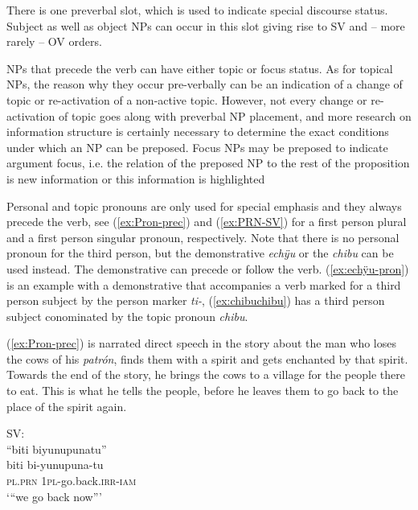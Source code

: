 There is one preverbal slot, which is used to indicate special discourse status. Subject as well as object NPs can occur in this slot giving rise to SV and – more rarely – OV orders. 

NPs that precede the verb can have either topic or focus status.  As for topical NPs, the reason why they occur pre-verbally can be an indication of a change of topic or re-activation of a non-active topic. However, not every change or re-activation of topic goes along with preverbal NP placement, and more research on information structure is certainly necessary to determine the exact conditions under which an NP can be preposed. Focus NPs may be preposed to indicate argument focus, i.e. the relation of the preposed NP to the rest of the proposition is new information or this information is highlighted \citep[cf.][228]{Lambrecht1994}

Personal and topic pronouns are only used for special emphasis and they always precede the verb, see (\ref{ex:Pron-prec}) and (\ref{ex:PRN-SV}) for a first person plural and a first person singular pronoun, respectively. Note that there is no personal pronoun for the third person, but the demonstrative \textit{echÿu} or the  \textit{chibu} can be used instead. The demonstrative can precede or follow the verb. (\ref{ex:echÿu-pron}) is an example with a demonstrative that accompanies a verb marked for a third person subject by the person marker \textit{ti-}, (\ref{ex:chibuchibu}) has a third person subject conominated by the topic pronoun \textit{chibu}.  %

(\ref{ex:Pron-prec}) is narrated direct speech in the story about the man who loses the cows of his \textit{patrón}, finds them with a spirit and gets enchanted by that spirit. Towards the end of the story, he brings the cows to a village for the people there to eat. This is what he tells the people, before he leaves them to go back to the place of the spirit again. 

\ea\label{ex:Pron-prec}
\begingl 
\glpreamble \textup{SV:}\\ “biti biyunupunatu”\\
\gla biti bi-yunupuna-tu\\ 
\textsc{pl.prn} 1\textsc{pl}-go.back.\textsc{irr}-\textsc{iam}\\ 
\glft ‘“we go back now”’
\trailingcitation{[mxx-n151017l-1.92]}
\xe

